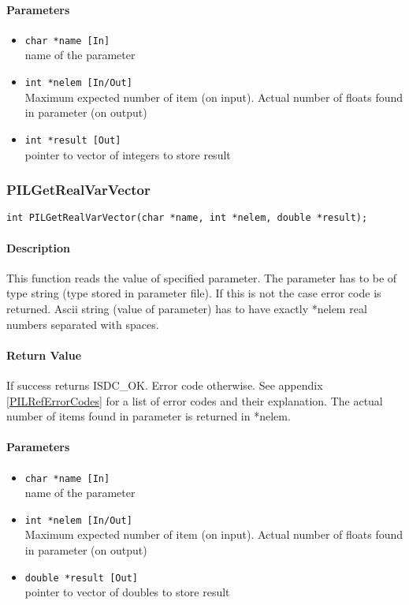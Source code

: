 \paragraph{Parameters}
\begin{itemize}
\item
{\tt char *name [In]} \\
name of the parameter 
\item
{\tt int *nelem [In/Out]} \\
Maximum expected number of item (on input). Actual number of floats found in
parameter (on output)
\item
{\tt int *result [Out]} \\
pointer to vector of integers to store result

\end{itemize}



\subsubsection{PILGetRealVarVector}

\begin{verbatim}
int PILGetRealVarVector(char *name, int *nelem, double *result); 
\end{verbatim}

\paragraph{Description\\}
This function reads the value of specified parameter. The parameter has
to be of type string (type stored in parameter file). If this is not the
case error code is returned. Ascii string (value of parameter) has to have
exactly *nelem real numbers separated with spaces.

\paragraph{Return Value\\}
If success returns ISDC\_OK. Error code otherwise. See appendix \ref{PILRefErrorCodes}
for a list of error codes and their explanation. The actual number
of items found in parameter is returned in *nelem.


\paragraph{Parameters}
\begin{itemize}
\item
{\tt char *name [In]} \\
name of the parameter
\item
{\tt int *nelem [In/Out]} \\
Maximum expected number of item (on input). Actual number of floats found in
parameter (on output)
\item
{\tt double *result [Out]} \\
pointer to vector of doubles to store result
\end{itemize}


